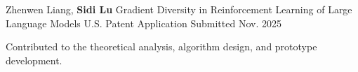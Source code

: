 
\begin{cventries}
  \cventry
    {Zhenwen Liang, \textbf{Sidi Lu}}
    {Gradient Diversity in Reinforcement Learning of Large Language Models}
    {U.S. Patent Application}
    {Submitted Nov. 2025}
    {
      \begin{cvitems}
        \item {Contributed to the theoretical analysis, algorithm design, and prototype development.}
      \end{cvitems}
    }
\end{cventries}

